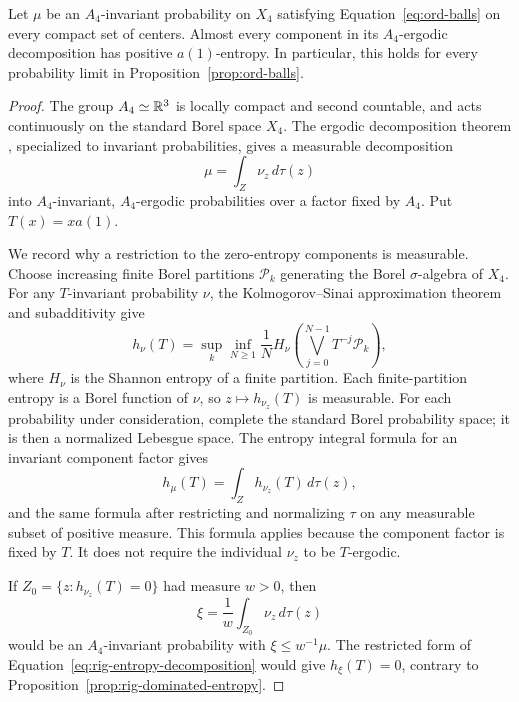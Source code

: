 \begin{corollary}
\label{cor:rig-positive-components}
Let \(\mu\) be an \(A_4\)-invariant probability on \(X_4\) satisfying
Equation~\eqref{eq:ord-balls} on every compact set of centers.  Almost every
component in its \(A_4\)-ergodic decomposition has positive
\(a(1)\)-entropy.  In particular, this holds for every probability
limit in Proposition~\ref{prop:ord-balls}.
\end{corollary}

\begin{proof}
The group \(A_4\simeq\mathbb R^3\) is locally compact and second countable,
and acts continuously on the standard Borel space \(X_4\).
The ergodic decomposition theorem
\cite[Theorem~5.2]{GreschonigSchmidt2000}, specialized to invariant
probabilities, gives a measurable decomposition
\[
 \mu=\int_Z\nu_z\,d\tau(z)
\]
into \(A_4\)-invariant, \(A_4\)-ergodic probabilities over a factor
fixed by \(A_4\).  Put \(T(x)=xa(1)\).

We record why a restriction to the zero-entropy components is
measurable.  Choose increasing finite Borel partitions
\(\mathcal P_k\) generating the Borel \(\sigma\)-algebra of \(X_4\).
For any \(T\)-invariant probability \(\nu\), the
Kolmogorov--Sinai approximation theorem and subadditivity give
\[
 h_\nu(T)=\sup_k\inf_{N\ge1}\frac1N
 H_\nu\left(\bigvee_{j=0}^{N-1}T^{-j}\mathcal P_k\right),
\]
where \(H_\nu\) is the Shannon entropy of a finite partition.
Each finite-partition entropy is a Borel function of \(\nu\), so
\(z\mapsto h_{\nu_z}(T)\) is measurable.
For each probability under consideration, complete the standard Borel
probability space; it is then a normalized Lebesgue space.
The entropy integral formula for an invariant component factor
\cite[Theorem~9.8]{Rokhlin1967} gives
\begin{equation}\label{eq:rig-entropy-decomposition}
 h_\mu(T)=\int_Z h_{\nu_z}(T)\,d\tau(z),
\end{equation}
and the same formula after restricting and normalizing \(\tau\) on
any measurable subset of positive measure.  This formula applies
because the component factor is fixed by \(T\).  It does not require
the individual \(\nu_z\) to be \(T\)-ergodic.

If \(Z_0=\{z:h_{\nu_z}(T)=0\}\) had measure \(w>0\), then
\[
 \xi=\frac1w\int_{Z_0}\nu_z\,d\tau(z)
\]
would be an \(A_4\)-invariant probability with \(\xi\le w^{-1}\mu\).
The restricted form of Equation~\eqref{eq:rig-entropy-decomposition}
would give \(h_\xi(T)=0\), contrary to
Proposition~\ref{prop:rig-dominated-entropy}.
\end{proof}

